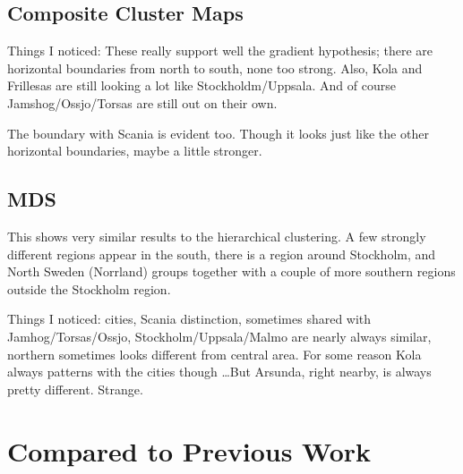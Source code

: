 

\subsection{Composite Cluster Maps}

Things I noticed: These really support well the gradient hypothesis;
there are horizontal boundaries from north to south, none too
strong. Also, Kola and Frillesas are still looking a lot like
Stockholdm/Uppsala. And of course Jamshog/Ossjo/Torsas are still out
on their own.

The boundary with Scania is evident too. Though it looks just like the
other horizontal boundaries, maybe a little stronger.

\subsection{MDS}

This shows very similar results to the hierarchical clustering. A
few strongly different regions appear in the south, there is a region
around Stockholm, and North Sweden (Norrland) groups together with a
couple of more southern regions outside the Stockholm region.

Things I noticed: cities, Scania distinction, sometimes shared with
Jamhog/Torsas/Ossjo, Stockholm/Uppsala/Malmo are nearly always
similar, northern sometimes looks different from central area. For
some reason Kola always patterns with the cities though \ldots But
Arsunda, right nearby, is always pretty different. Strange.

\section{Compared to Previous Work}

